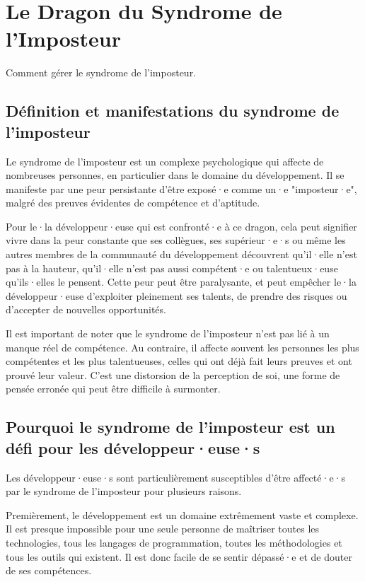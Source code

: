 \chapter{Le Dragon du Syndrome de l'Imposteur}
Comment gérer le syndrome de l'imposteur.

\section{Définition et manifestations du syndrome de l'imposteur}

Le syndrome de l'imposteur est un complexe psychologique qui affecte de nombreuses personnes, en particulier dans le domaine du développement. Il se manifeste par une peur persistante d'être exposé·e comme un·e "imposteur·e", malgré des preuves évidentes de compétence et d'aptitude.

Pour le·la développeur·euse qui est confronté·e à ce dragon, cela peut signifier vivre dans la peur constante que ses collègues, ses supérieur·e·s ou même les autres membres de la communauté du développement découvrent qu'il·elle n'est pas à la hauteur, qu'il·elle n'est pas aussi compétent·e ou talentueux·euse qu'ils·elles le pensent. Cette peur peut être paralysante, et peut empêcher le·la développeur·euse d'exploiter pleinement ses talents, de prendre des risques ou d'accepter de nouvelles opportunités.

Il est important de noter que le syndrome de l'imposteur n'est pas lié à un manque réel de compétence. Au contraire, il affecte souvent les personnes les plus compétentes et les plus talentueuses, celles qui ont déjà fait leurs preuves et ont prouvé leur valeur. C'est une distorsion de la perception de soi, une forme de pensée erronée qui peut être difficile à surmonter.

\section{Pourquoi le syndrome de l'imposteur est un défi pour les développeur·euse·s}

Les développeur·euse·s sont particulièrement susceptibles d'être affecté·e·s par le syndrome de l'imposteur pour plusieurs raisons.

Premièrement, le développement est un domaine extrêmement vaste et complexe. Il est presque impossible pour une seule personne de maîtriser toutes les technologies, tous les langages de programmation, toutes les méthodologies et tous les outils qui existent. Il est donc facile de se sentir dépassé·e et de douter de ses compétences.

